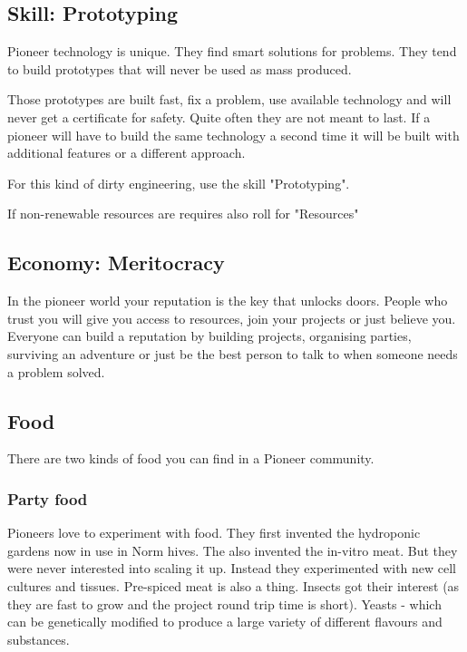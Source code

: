 \subsection{Skill: Prototyping}
\label{sec:Prototyping skill}

Pioneer technology is unique. They find smart solutions for problems. They tend to build prototypes that will never be used as mass produced.

Those prototypes are built fast, fix a problem, use available technology and will never get a certificate for safety.
Quite often they are not meant to last.
If a pioneer will have to build the same technology a second time it will be built with additional features or a different approach.

For this kind of dirty engineering, use the skill "Prototyping".

If non-renewable resources are requires also roll for "Resources"

\subsection{Economy: Meritocracy}
\label{sec:meritocracy}

In the pioneer world your reputation is the key that unlocks doors. People who trust you will give you access to resources, join your projects or just believe you.
Everyone can build a reputation by building projects, organising parties, surviving an adventure or just be the best person to talk to when someone needs a problem solved.

\subsection{Food}
\label{sec: pioneer food}

There are two kinds of food you can find in a Pioneer community.

\subsubsection{Party food}

Pioneers love to experiment with food. They first invented the hydroponic gardens now in use in Norm hives. The also invented the in-vitro meat. But they were never interested into scaling it up. Instead they experimented with new cell cultures and tissues. Pre-spiced meat is also a thing.
Insects got their interest (as they are fast to grow and the project round trip time is short). Yeasts - which can be genetically modified to produce a large variety of different flavours and substances.

